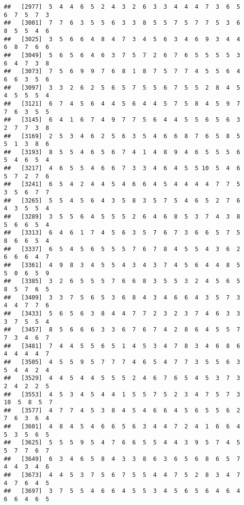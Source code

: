 \documentclass[
]{book}
\begin{document}
\begin{verbatim}
##   [2977]  5  4  4  6  5  2  4  3  2  6  3  3  4  4  4  7  3  6  5  6  7  5  7  3
##   [3001]  7  7  6  3  5  5  6  3  3  8  5  5  7  5  7  7  5  3  6  8  5  5  4  6
##   [3025]  3  5  6  6  4  8  4  7  3  4  5  6  3  4  6  9  3  4  4  6  8  7  6  6
##   [3049]  5  6  5  6  4  6  3  7  5  7  2  6  7  6  5  5  5  5  3  6  4  7  3  8
##   [3073]  7  5  6  9  9  7  6  8  1  8  7  5  7  7  4  5  5  6  4  6  6  3  5  6
##   [3097]  3  3  2  6  2  5  6  5  7  5  5  6  7  5  5  2  8  4  5  4  5  5  5  4
##   [3121]  6  7  4  5  6  4  4  5  6  4  4  5  7  5  8  4  5  9  7  7  6  3  5  5
##   [3145]  6  4  1  6  7  4  9  7  7  5  6  4  4  5  5  6  5  6  3  2  7  7  3  8
##   [3169]  2  5  3  4  6  2  5  6  3  5  4  6  6  8  7  6  5  8  5  5  1  3  8  6
##   [3193]  8  5  5  4  6  5  6  7  4  1  4  8  9  4  6  5  5  5  6  5  4  6  5  4
##   [3217]  4  6  5  5  4  6  6  7  3  3  4  6  4  5  5 10  5  4  6  5  7  2  7  6
##   [3241]  6  5  4  2  4  4  5  4  6  6  4  5  4  4  4  4  7  7  5  3  5  6  7  7
##   [3265]  5  5  4  5  6  4  3  5  8  3  5  7  5  4  6  5  2  7  6  4  3  5  5  4
##   [3289]  3  5  5  6  4  5  5  5  2  6  4  6  8  5  3  7  4  3  8  5  6  6  5  4
##   [3313]  6  4  6  1  7  4  5  6  3  5  7  6  7  3  6  6  5  7  5  8  6  6  5  4
##   [3337]  6  5  4  5  6  5  5  5  7  6  7  8  4  5  5  4  3  6  2  6  6  6  4  7
##   [3361]  4  9  8  3  4  5  5  4  3  4  3  7  4  5  6  4  4  8  5  5  0  6  5  9
##   [3385]  3  2  6  5  5  5  7  6  6  8  3  5  5  3  2  4  5  6  5  8  5  7  6  5
##   [3409]  3  3  7  5  6  5  3  6  8  4  3  4  6  6  4  3  5  7  3  4  4  7  7  6
##   [3433]  5  6  5  6  3  8  4  4  7  7  2  3  2  3  7  4  6  3  3  3  7  5  5  4
##   [3457]  8  5  6  6  6  3  3  6  7  6  7  4  2  8  6  4  5  5  7  7  3  4  6  7
##   [3481]  7  4  4  5  5  6  5  1  4  5  3  4  7  8  3  4  6  8  6  4  4  4  4  7
##   [3505]  4  5  5  9  5  7  7  7  4  6  5  4  7  7  3  5  5  6  3  5  4  4  2  4
##   [3529]  4  4  5  4  4  5  5  5  2  4  6  7  6  5  4  5  3  7  3  2  4  2  2  5
##   [3553]  4  5  3  4  5  4  4  1  5  5  7  5  2  3  4  7  5  7  3 10  5  8  5  7
##   [3577]  4  7  7  4  5  3  8  4  5  4  6  6  4  5  6  5  5  6  2  7  6  3  6  4
##   [3601]  4  8  4  5  4  6  6  5  6  3  4  4  7  2  4  1  6  6  4  5  3  5  6  5
##   [3625]  5  5  5  9  5  4  7  6  6  5  5  4  4  3  9  5  7  4  5  5  7  7  6  7
##   [3649]  6  3  4  6  5  8  4  3  3  8  6  3  6  5  6  8  6  5  7  4  4  3  4  6
##   [3673]  4  4  5  3  7  5  6  7  5  5  4  4  7  5  2  8  3  4  7  4  7  6  4  5
##   [3697]  3  7  5  5  4  6  6  4  5  5  3  4  5  6  5  6  4  6  4  6  6  4  6  5

\end{verbatim}
\end{document}
